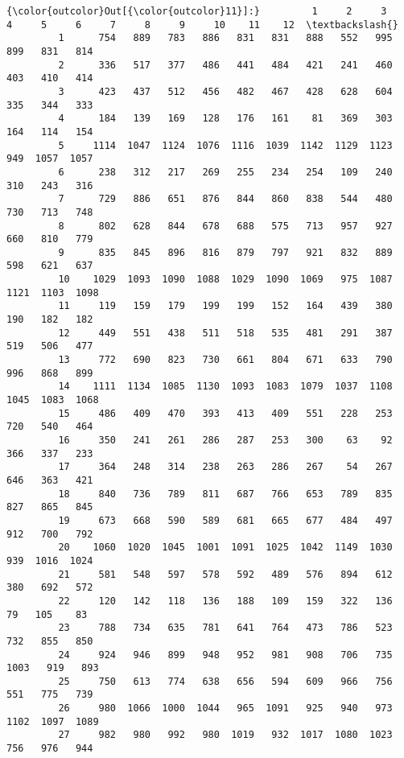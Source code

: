 \documentclass[11pt]{article}
\begin{document}
\begin{Verbatim}[commandchars=\\\{\}]
{\color{outcolor}Out[{\color{outcolor}11}]:}         1     2     3     4     5     6     7     8     9     10    11    12  \textbackslash{}
         1      754   889   783   886   831   831   888   552   995   899   831   814   
         2      336   517   377   486   441   484   421   241   460   403   410   414   
         3      423   437   512   456   482   467   428   628   604   335   344   333   
         4      184   139   169   128   176   161    81   369   303   164   114   154   
         5     1114  1047  1124  1076  1116  1039  1142  1129  1123   949  1057  1057   
         6      238   312   217   269   255   234   254   109   240   310   243   316   
         7      729   886   651   876   844   860   838   544   480   730   713   748   
         8      802   628   844   678   688   575   713   957   927   660   810   779   
         9      835   845   896   816   879   797   921   832   889   598   621   637   
         10    1029  1093  1090  1088  1029  1090  1069   975  1087  1121  1103  1098   
         11     119   159   179   199   199   152   164   439   380   190   182   182   
         12     449   551   438   511   518   535   481   291   387   519   506   477   
         13     772   690   823   730   661   804   671   633   790   996   868   899   
         14    1111  1134  1085  1130  1093  1083  1079  1037  1108  1045  1083  1068   
         15     486   409   470   393   413   409   551   228   253   720   540   464   
         16     350   241   261   286   287   253   300    63    92   366   337   233   
         17     364   248   314   238   263   286   267    54   267   646   363   421   
         18     840   736   789   811   687   766   653   789   835   827   865   845   
         19     673   668   590   589   681   665   677   484   497   912   700   792   
         20    1060  1020  1045  1001  1091  1025  1042  1149  1030   939  1016  1024   
         21     581   548   597   578   592   489   576   894   612   380   692   572   
         22     120   142   118   136   188   109   159   322   136    79   105    83   
         23     788   734   635   781   641   764   473   786   523   732   855   850   
         24     924   946   899   948   952   981   908   706   735  1003   919   893   
         25     750   613   774   638   656   594   609   966   756   551   775   739   
         26     980  1066  1000  1044   965  1091   925   940   973  1102  1097  1089   
         27     982   980   992   980  1019   932  1017  1080  1023   756   976   944   

\end{Verbatim}
\end{document}
